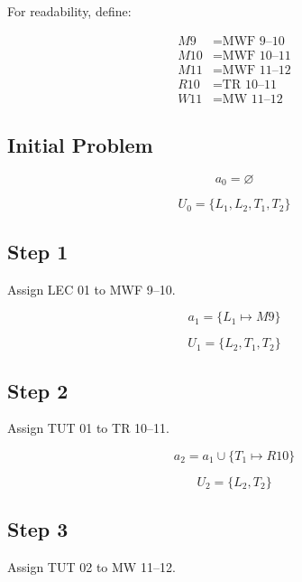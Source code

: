 \documentclass[11pt,letterpaper]{article}
\begin{document}
For readability, define:

\begin{align*}
M9 &= \text{MWF 9--10}\\
M10 &= \text{MWF 10--11}\\
M11 &= \text{MWF 11--12}\\
R10 &= \text{TR 10--11}\\
W11 &= \text{MW 11--12}
\end{align*}

\subsection{Initial Problem}

\begin{equation}
a_0=\varnothing
\end{equation}

\begin{equation}
U_0=\{L_1,L_2,T_1,T_2\}
\end{equation}

\subsection{Step 1}

Assign LEC 01 to MWF 9--10.

\begin{equation}
a_1=\{L_1\mapsto M9\}
\end{equation}

\begin{equation}
U_1=\{L_2,T_1,T_2\}
\end{equation}

\subsection{Step 2}

Assign TUT 01 to TR 10--11.

\begin{equation}
a_2=a_1\cup\{T_1\mapsto R10\}
\end{equation}

\begin{equation}
U_2=\{L_2,T_2\}
\end{equation}

\subsection{Step 3}

Assign TUT 02 to MW 11--12.
\end{document}
